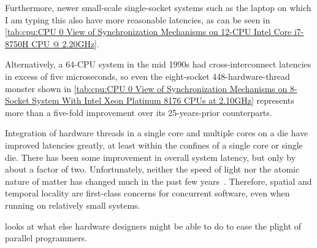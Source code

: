 {{	Furthermore, newer small-scale single-socket systems such
	as the laptop on which I am typing this also have more
	reasonable latencies, as can be seen in
	\cref{tab:cpu:CPU 0 View of Synchronization Mechanisms on 12-CPU Intel Core i7-8750H CPU @ 2.20GHz}.

	Alternatively, a 64-CPU system in the mid 1990s had
	cross-interconnect latencies in excess of five microseconds,
	so even the eight-socket 448-hardware-thread monster shown in
	\cref{tab:cpu:CPU 0 View of Synchronization Mechanisms on 8-Socket System With Intel Xeon Platinum 8176 CPUs at 2.10GHz}
	represents more than a five-fold improvement over its
	25-years-prior counterparts.

	Integration of hardware threads in a single core and multiple
	cores on a die have improved latencies greatly, at least within the
	confines of a single core or single die.
	There has been some improvement in overall system latency,
	but only by about a factor of two.
	Unfortunately, neither the speed of light nor the atomic nature
	of matter has changed much in the past few
	years~\cite{NoBugsHare2016CPUoperations}.
	Therefore, spatial and temporal locality are first-class concerns
	for concurrent software, even when running on relatively
	small systems.

	looks at what else hardware designers might be
	able to do to ease the plight of parallel programmers.
}\QuickQuizEndB
%
\QuickQuizEndE
}                 %

